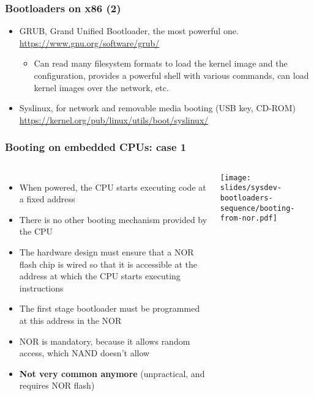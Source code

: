 \begin{frame}
  \frametitle{Bootloaders on x86 (2)}
  \begin{itemize}
  \item GRUB, Grand Unified Bootloader, the most powerful one.\\
    \url{https://www.gnu.org/software/grub/}
    \begin{itemize}
    \item Can read many filesystem formats to load the kernel image
      and the configuration, provides a powerful shell with various
      commands, can load kernel images over the network, etc.
    \end{itemize}
  \item Syslinux, for network and removable media booting (USB key, CD-ROM)\\
    \small\url{https://kernel.org/pub/linux/utils/boot/syslinux/}\normalsize
  \end{itemize}
\end{frame}

\begin{frame}
  \frametitle{Booting on embedded CPUs: case 1}
  \begin{columns}
    \begin{itemize}
    \item When powered, the CPU starts executing code at a fixed address
    \item There is no other booting mechanism provided by the CPU
    \item The hardware design must ensure that a NOR flash chip is
      wired so that it is accessible at the address at which the CPU
      starts executing instructions
    \item The first stage bootloader must be programmed at this
      address in the NOR
    \item NOR is mandatory, because it allows random access, which
      NAND doesn't allow
    \item {\bf Not very common anymore} (unpractical, and requires NOR
      flash)
    \end{itemize}
    \texttt{[image: slides/sysdev-bootloaders-sequence/booting-from-nor.pdf]}
  \end{columns}
\end{frame}

